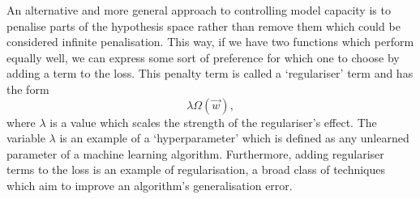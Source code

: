 An alternative and more general approach to controlling model capacity is to penalise parts of the hypothesis space rather than remove them which could be considered infinite penalisation. This way, if we have two functions which perform equally well, we can express some sort of preference for which one to choose by adding a term to the loss. This penalty term is called a `regulariser' term and has the form
\begin{equation}
    \lambda\Omega(\vec{w}),
\end{equation}
where $\lambda$ is a value which scales the strength of the regulariser's effect. The variable $\lambda$ is an example of a `hyperparameter' which is defined as any unlearned parameter of a machine learning algorithm. Furthermore, adding regulariser terms to the loss is an example of regularisation, a broad class of techniques which aim to improve an algorithm's generalisation error. 


